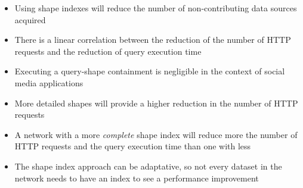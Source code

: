\begin{itemize}[label=\textbf{H}\,]
    \item Using shape indexes will reduce the number of non-contributing data sources acquired
    \item There is a linear correlation between the reduction of the number of HTTP requests and the reduction of query execution time
    \item Executing a query-shape containment is negligible in the context of social media applications
    \item More detailed  shapes will provide a higher reduction in the number of HTTP requests
    \item A network with a more \emph{complete} shape index will reduce more the number of HTTP requests and the query execution time than one with less
    \item The shape index approach can be adaptative, so not every dataset in the network needs to have an index to see a performance improvement
\end{itemize}

